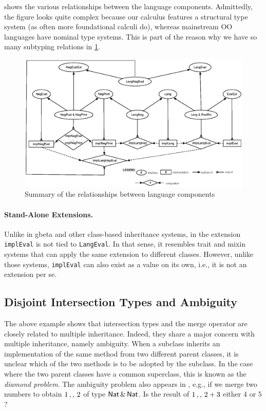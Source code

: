 shows the various relationships between the language
components. Admittedly, the figure looks quite complex because our calculus
features a structural type system (as often more foundational calculi do),
whereas mainstream OO languages have nominal type systems. This is part of the
reason why we have so many subtyping relations in \cref{fig:diagram}.

\begin{figure}[t]
  \centering
\includegraphics[scale=0.75]{diagram.eps}
\caption{Summary of the relationships between language components}
\label{fig:diagram}
\end{figure}


\paragraph{Stand-Alone Extensions.}
Unlike in gbeta and other class-based inheritance systems, in \namee
the extension \lstinline{implEval} is not tied to \lstinline{LangEval}. In that
sense, it resembles trait and mixin systems that can apply the same extension
to different classes. However, unlike those systems, \lstinline{implEval} can also
exist as a value on its own, i.e., it is not an extension per se.

\subsection{Disjoint Intersection Types and Ambiguity}

The above example shows that intersection types and the merge operator
are closely related to multiple
inheritance. Indeed, they share a major concern with multiple inheritance,
namely ambiguity. When a subclass inherits an implementation of the same
method from two different parent classes, it is unclear which of the two
methods is to be adopted by the subclass. In the case where the two parent classes
have a common superclass, this is known as the \emph{diamond problem}.
The ambiguity problem also appears in \namee,
e.g., if we merge two numbers to obtain $1 \, ,, \, 2$ of type
$\mathsf{Nat} \,\&\, \mathsf{Nat}$. Is the result of $1 \, ,, \, 2 + 3$
either $4$ or $5$?

